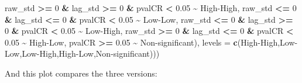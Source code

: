 \documentclass[
]{book}
\newenvironment{Shaded}{\begin{snugshade}}{\end{snugshade}}
\newcommand{\AttributeTok}[1]{\textcolor[rgb]{0.13,0.29,0.53}{#1}}
\newcommand{\DecValTok}[1]{\textcolor[rgb]{0.00,0.00,0.81}{#1}}
\newcommand{\FloatTok}[1]{\textcolor[rgb]{0.00,0.00,0.81}{#1}}
\newcommand{\FunctionTok}[1]{\textcolor[rgb]{0.13,0.29,0.53}{\textbf{#1}}}
\newcommand{\NormalTok}[1]{#1}
\newcommand{\SpecialCharTok}[1]{\textcolor[rgb]{0.81,0.36,0.00}{\textbf{#1}}}
\newcommand{\StringTok}[1]{\textcolor[rgb]{0.31,0.60,0.02}{#1}}
\begin{document}
\begin{Shaded}
\begin{Highlighting}[]
\NormalTok{           raw\_std }\SpecialCharTok{\textgreater{}=} \DecValTok{0} \SpecialCharTok{\&}\NormalTok{ lag\_std }\SpecialCharTok{\textgreater{}=} \DecValTok{0} \SpecialCharTok{\&}\NormalTok{ pvalCR }\SpecialCharTok{\textless{}} \FloatTok{0.05} \SpecialCharTok{\textasciitilde{}} \StringTok{\textquotesingle{}High{-}High\textquotesingle{}}\NormalTok{,}
\NormalTok{            raw\_std }\SpecialCharTok{\textless{}=} \DecValTok{0} \SpecialCharTok{\&}\NormalTok{ lag\_std }\SpecialCharTok{\textless{}=} \DecValTok{0} \SpecialCharTok{\&}\NormalTok{ pvalCR }\SpecialCharTok{\textless{}} \FloatTok{0.05} \SpecialCharTok{\textasciitilde{}} \StringTok{\textquotesingle{}Low{-}Low\textquotesingle{}}\NormalTok{,}
\NormalTok{            raw\_std }\SpecialCharTok{\textless{}=} \DecValTok{0} \SpecialCharTok{\&}\NormalTok{ lag\_std }\SpecialCharTok{\textgreater{}=} \DecValTok{0} \SpecialCharTok{\&}\NormalTok{ pvalCR }\SpecialCharTok{\textless{}} \FloatTok{0.05} \SpecialCharTok{\textasciitilde{}} \StringTok{\textquotesingle{}Low{-}High\textquotesingle{}}\NormalTok{,}
\NormalTok{            raw\_std }\SpecialCharTok{\textgreater{}=} \DecValTok{0} \SpecialCharTok{\&}\NormalTok{ lag\_std }\SpecialCharTok{\textless{}=} \DecValTok{0} \SpecialCharTok{\&}\NormalTok{ pvalCR }\SpecialCharTok{\textless{}} \FloatTok{0.05} \SpecialCharTok{\textasciitilde{}} \StringTok{\textquotesingle{}High{-}Low\textquotesingle{}}\NormalTok{,}
\NormalTok{            pvalCR }\SpecialCharTok{\textgreater{}=} \FloatTok{0.05} \SpecialCharTok{\textasciitilde{}} \StringTok{\textquotesingle{}Non{-}significant\textquotesingle{}}\NormalTok{),}
           \AttributeTok{levels =} \FunctionTok{c}\NormalTok{(}\StringTok{\textquotesingle{}High{-}High\textquotesingle{}}\NormalTok{,}\StringTok{\textquotesingle{}Low{-}Low\textquotesingle{}}\NormalTok{,}\StringTok{\textquotesingle{}Low{-}High\textquotesingle{}}\NormalTok{,}\StringTok{\textquotesingle{}High{-}Low\textquotesingle{}}\NormalTok{,}\StringTok{\textquotesingle{}Non{-}significant\textquotesingle{}}\NormalTok{)))}
\end{Highlighting}
\end{Shaded}

And this plot compares the three versions:
\end{document}
